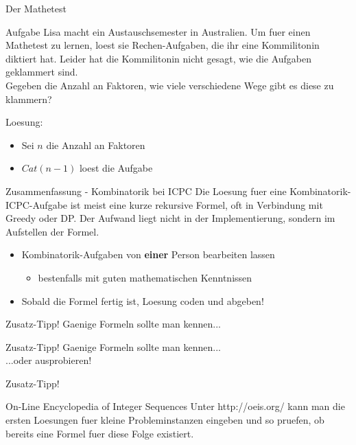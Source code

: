 \documentclass[18pt]{beamer}
\begin{document}
\begin{frame}{Der Mathetest}
\begin{block}{Aufgabe}
Lisa macht ein Austauschsemester in Australien. Um fuer einen Mathetest zu lernen, loest sie Rechen-Aufgaben, die ihr eine Kommilitonin diktiert hat. Leider hat die Kommilitonin nicht gesagt, wie die Aufgaben geklammert sind. \\
Gegeben die Anzahl an Faktoren, wie viele verschiedene Wege gibt es diese zu klammern?
\end{block}
\pause
Loesung:
\begin{itemize}
\item Sei $n$ die Anzahl an Faktoren
\item $Cat \left( n-1 \right)$ loest die Aufgabe
\end{itemize}
\end{frame}

\begin{frame}{Zusammenfassung - Kombinatorik bei ICPC}
Die Loesung fuer eine Kombinatorik-ICPC-Aufgabe ist meist eine kurze rekursive Formel, oft in Verbindung mit Greedy oder DP. Der Aufwand liegt nicht in der Implementierung, sondern im Aufstellen der Formel.
\pause
\begin{itemize}
\item Kombinatorik-Aufgaben von \textbf{einer} Person bearbeiten lassen
\pause
\begin{itemize}
\item bestenfalls mit guten mathematischen Kenntnissen
\end{itemize}
\pause
\item Sobald die Formel fertig ist, Loesung coden und abgeben!
\end{itemize}
\end{frame}

\begin{frame}{Zusatz-Tipp!}
Gaenige Formeln sollte man kennen... \\

\end{frame}

\begin{frame}{Zusatz-Tipp!}
Gaenige Formeln sollte man kennen... \\



...oder ausprobieren! \\

\end{frame}

\begin{frame}{Zusatz-Tipp!}
\begin{block}{On-Line Encyclopedia of Integer Sequences}
Unter http://oeis.org/ kann man die ersten Loesungen fuer kleine Probleminstanzen eingeben und so pruefen, ob bereits eine Formel fuer diese Folge existiert.
\end{block}

\end{frame}
\end{document}
